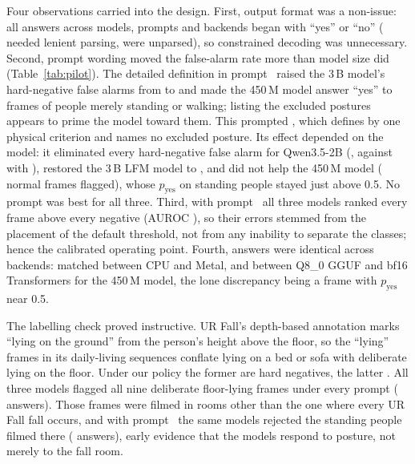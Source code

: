 Four observations carried into the design. First, output format was a non-issue: all \PilotNAnswers{} answers across models, prompts and backends began with ``yes'' or ``no'' (\PilotNLenient{} needed lenient parsing, \PilotNUnparsed{} were unparsed), so constrained decoding was unnecessary. Second, prompt wording moved the false-alarm rate more than model size did (Table~\ref{tab:pilot}). The detailed definition in prompt~\promptB{} raised the 3\,B model's hard-negative false alarms from \PilotLargeAFaHard{} to \PilotLargeBFaHard{} and made the 450\,M model answer ``yes'' to \PilotSmallBFaNormal{} frames of people merely standing or walking; listing the excluded postures appears to prime the model toward them. This prompted \promptBtwo{}, which defines \pd{} by one physical criterion and names no excluded posture. Its effect depended on the model: it eliminated every hard-negative false alarm for Qwen3.5-2B (\PilotQwenBtwoFaHard{}, against \PilotQwenAFaHard{} with \promptA), restored the 3\,B LFM model to \PilotLargeBtwoFaHard{}, and did not help the 450\,M model (\PilotSmallBtwoFaNormal{} normal frames flagged), whose $p_\text{yes}$ on standing people stayed just above 0.5. No prompt was best for all three. Third, with prompt~\promptA{} all three models ranked every \pd{} frame above every negative (AUROC \PilotLargeAAuroc{}), so their errors stemmed from the placement of the default threshold, not from any inability to separate the classes; hence the calibrated operating point. Fourth, answers were identical across backends: \PilotCpuGpuAgree{} matched between CPU and Metal, and \PilotQeightBfAgree{} between Q8\_0 GGUF and bf16 Transformers for the 450\,M model, the lone discrepancy being a frame with $p_\text{yes}$ near 0.5.

The labelling check proved instructive. UR Fall's depth-based annotation marks ``lying on the ground'' from the person's height above the floor, so the ``lying'' frames in its daily-living sequences conflate lying on a bed or sofa with deliberate lying on the floor. Under our policy the former are hard negatives, the latter \pd{}. All three models flagged all nine deliberate floor-lying frames under every prompt (\PilotFloorHits{} answers). Those frames were filmed in rooms other than the one where every UR Fall fall occurs, and with prompt~\promptA{} the same models rejected the standing people filmed there (\PilotSameRoomNormalRejectA{} answers), early evidence that the models respond to posture, not merely to the fall room.

